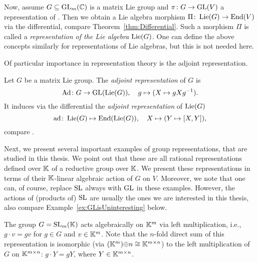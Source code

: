 \medskip

Now, assume $G \subseteq \operatorname{GL}_m(\mathbb C)$ is a matrix Lie group and $\pi \colon G \to \operatorname{GL}(V)$ a representation of . Then we obtain a Lie algebra morphism $\Pi \colon \operatorname{Lie}(G) \to \operatorname{End}(V)$ via the differential, compare Theorem~\ref{thm:Differential}. Such a morphism $\Pi$ is called a \emph{representation of the Lie algebra} $\operatorname{Lie}(G)$. One can define the above concepts similarly for representations of Lie algebras, but this is not needed here. %

\medskip

Of particular importance in representation theory is the adjoint representation.

\begin{example} \label{ex:AdjointRep}
	Let $G$ be a matrix Lie group. The \emph{adjoint representation} of $G$ is
		\[ \mathrm{Ad} \colon G \to \operatorname{GL}(\operatorname{Lie}(G)), \quad g \mapsto (X \mapsto g X g^{-1}) .\]
	It induces via the differential the \emph{adjoint representation} of $\operatorname{Lie}(G)$
		\[ \mathrm{ad} \colon \operatorname{Lie}(G) \mapsto \operatorname{End}(\operatorname{Lie}(G)), \quad X \mapsto (Y \mapsto [X,Y]) , \]
	compare \cite[Proposition~3.34]{HallBook}.
	\hfill\exSymbol
\end{example}

Next, we present several important examples of group representations, that are studied in this thesis. We point out that these are all rational representations defined over $\mathbb K$ of a reductive group over $\mathbb K$. We present these representations in terms of their $\mathbb K$-linear algebraic action of $G$ on $V$. Moreover, we note that one can, of course, replace $\operatorname{SL}$ always with $\operatorname{GL}$ in these examples. However, the actions of (products of) $\operatorname{SL}$ are usually the ones we are interested in this thesis, also compare Example~\ref{ex:GLisUninteresting} below.


\begin{example} \label{ex:RepLeftMult}
	The group $G = \operatorname{SL}_m(\mathbb K)$ acts algebraically on $\mathbb K^{m}$ via left multiplication, i.e., $g \cdot v = gv$ for $g \in G$ and $v \in \mathbb K^{m}$. Note that the $n$-fold direct sum of this representation is isomorphic (via $(\mathbb K^m){\oplus n} \cong \mathbb K^{m \times n}$) to the left multiplication of $G$ on $\mathbb K^{m \times n}$: $g \cdot Y = gY$, where $Y \in \mathbb K^{m \times n}$.
	\hfill\exSymbol
\end{example}

